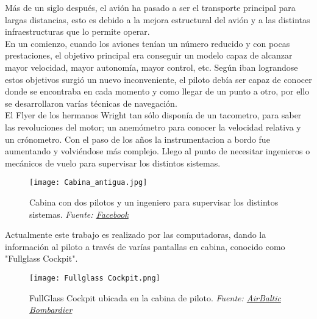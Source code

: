 Más de un siglo después, el avión ha pasado a ser el transporte principal para largas distancias, esto es debido a la mejora estructural del avión y a las distintas infraestructuras que lo permite operar.\\

En un comienzo, cuando los aviones tenían un número reducido y con pocas prestaciones, el objetivo principal era conseguir un modelo capaz de alcanzar mayor velocidad, mayor autonomía, mayor control, etc. Según iban lograndose estos objetivos surgió un nuevo inconveniente, el piloto debía ser capaz de conocer donde se encontraba en cada momento y como llegar de un punto a otro, por ello se desarrollaron varías técnicas de navegación.\\

El Flyer de los hermanos Wright tan sólo disponía de un tacometro, para saber las revoluciones del motor; un anemómetro para conocer la velocidad relativa y un crónometro.
Con el paso de los años la instrumentacion a bordo fue aumentando y volviéndose más complejo. Llego al punto de necesitar ingenieros o mecánicos de vuelo para supervisar los distintos sistemas.\\
\newpage

\begin{figure}[H] 
	\centering 
	\texttt{[image: Cabina\_antigua.jpg]} %
	\caption{\centering Cabina con dos pilotos y un ingeniero para supervisar los distintos sistemas. \textit{Fuente: \href{https://www.facebook.com/photo.php?fbid=953769662772159&id=100044174032530&set=a.286676282814837}{Facebook}}}
	\label{fig:placeholder} %
\end{figure}

Actualmente este trabajo es realizado por las computadoras, dando la información al piloto a través de varías pantallas en cabina, conocido como "Fullglass Cockpit".\\

\begin{figure}[H] 
	\centering 
	\texttt{[image: Fullglass Cockpit.png]} %
	\caption{\centering  FullGlass Cockpit ubicada en la cabina de piloto.  \textit{Fuente: \href{https://es.m.wikipedia.org/wiki/Archivo:AirBaltic_Bombardier_CS300_launch_event_(31581897816).jpg}{AirBaltic Bombardier}}}
	\label{fig:placeholder} %
\end{figure}

